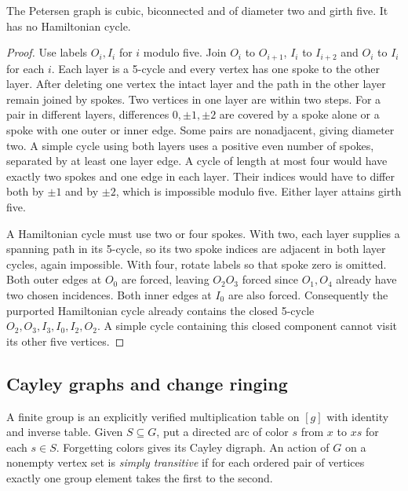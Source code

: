 \begin{proposition}\label{result23}
The Petersen graph is cubic, biconnected and of diameter two and girth five. It has no Hamiltonian cycle.
\end{proposition}
\begin{proof}
Use labels $O_i,I_i$ for $i$ modulo five. Join $O_i$ to $O_{i+1}$, $I_i$ to $I_{i+2}$ and $O_i$ to $I_i$ for each $i$. Each layer is a 5-cycle and every vertex has one spoke to the other layer. After deleting one vertex the intact layer and the path in the other layer remain joined by spokes. Two vertices in one layer are within two steps. For a pair in different layers, differences $0,\pm1,\pm2$ are covered by a spoke alone or a spoke with one outer or inner edge. Some pairs are nonadjacent, giving diameter two. A simple cycle using both layers uses a positive even number of spokes, separated by at least one layer edge. A cycle of length at most four would have exactly two spokes and one edge in each layer. Their indices would have to differ both by $\pm1$ and by $\pm2$, which is impossible modulo five. Either layer attains girth five.

A Hamiltonian cycle must use two or four spokes. With two, each layer supplies a spanning path in its 5-cycle, so its two spoke indices are adjacent in both layer cycles, again impossible. With four, rotate labels so that spoke zero is omitted. Both outer edges at $O_0$ are forced, leaving $O_2O_3$ forced since $O_1,O_4$ already have two chosen incidences. Both inner edges at $I_0$ are also forced. Consequently the purported Hamiltonian cycle already contains the closed 5-cycle $O_2,O_3,I_3,I_0,I_2,O_2$. A simple cycle containing this closed component cannot visit its other five vertices.
\end{proof}

\subsection{Cayley graphs and change ringing}

A finite group is an explicitly verified multiplication table on $[g]$ with identity and inverse table. Given $S\subseteq G$, put a directed arc of color $s$ from $x$ to $xs$ for each $s\in S$. Forgetting colors gives its Cayley digraph. An action of $G$ on a nonempty vertex set is \emph{simply transitive} if for each ordered pair of vertices exactly one group element takes the first to the second.

